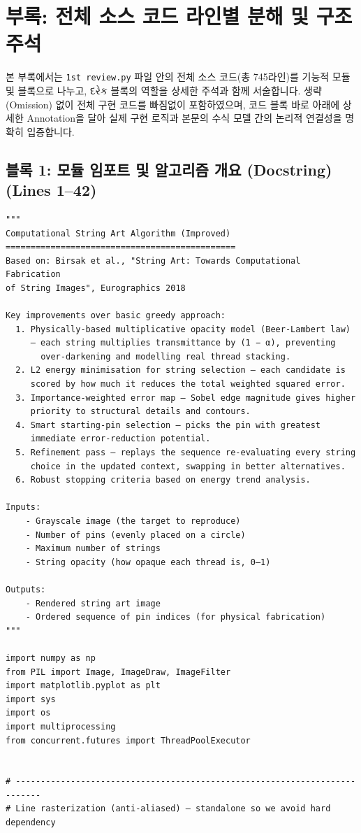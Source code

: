 \clearpage
\section{부록: 전체 소스 코드 라인별 분해 및 구조 주석}

본 부록에서는 \texttt{1st review.py} 파일 안의 전체 소스 코드(총 745라인)를 기능적 모듈 및 블록으로 나누고, દરેક 블록의 역할을 상세한 주석과 함께 서술합니다. 
생략(Omission) 없이 전체 구현 코드를 빠짐없이 포함하였으며, 코드 블록 바로 아래에 상세한 Annotation을 달아 실제 구현 로직과 본문의 수식 모델 간의 논리적 연결성을 명확히 입증합니다.

\subsection*{블록 1: 모듈 임포트 및 알고리즘 개요 (Docstring) (Lines 1--42)}
\begin{lstlisting}[firstnumber=1]
"""
Computational String Art Algorithm (Improved)
==============================================
Based on: Birsak et al., "String Art: Towards Computational Fabrication
of String Images", Eurographics 2018

Key improvements over basic greedy approach:
  1. Physically-based multiplicative opacity model (Beer-Lambert law)
     – each string multiplies transmittance by (1 − α), preventing
       over-darkening and modelling real thread stacking.
  2. L2 energy minimisation for string selection – each candidate is
     scored by how much it reduces the total weighted squared error.
  3. Importance-weighted error map – Sobel edge magnitude gives higher
     priority to structural details and contours.
  4. Smart starting-pin selection – picks the pin with greatest
     immediate error-reduction potential.
  5. Refinement pass – replays the sequence re-evaluating every string
     choice in the updated context, swapping in better alternatives.
  6. Robust stopping criteria based on energy trend analysis.

Inputs:
    - Grayscale image (the target to reproduce)
    - Number of pins (evenly placed on a circle)
    - Maximum number of strings
    - String opacity (how opaque each thread is, 0–1)

Outputs:
    - Rendered string art image
    - Ordered sequence of pin indices (for physical fabrication)
"""

import numpy as np
from PIL import Image, ImageDraw, ImageFilter
import matplotlib.pyplot as plt
import sys
import os
import multiprocessing
from concurrent.futures import ThreadPoolExecutor


# ---------------------------------------------------------------------------
# Line rasterization (anti-aliased) – standalone so we avoid hard dependency
\end{lstlisting}
